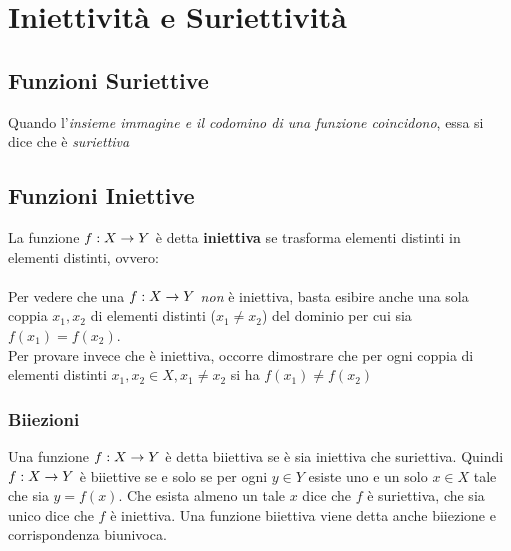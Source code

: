 \documentclass[12pt, a4paper, openany]{book}
\begin{document}
\section{Iniettività e Suriettività}

\subsection*{Funzioni Suriettive}
Quando l'\emph{insieme immagine e il codomino di una funzione coincidono}, essa si dice che è \emph{suriettiva}

\subsection*{Funzioni Iniettive}
La funzione $f: X \rightarrow Y$ è detta \textbf{iniettiva} se trasforma elementi distinti in elementi distinti, ovvero:
\paragraph{}Per vedere che una $f: X \rightarrow Y$ \emph{non} è iniettiva, basta esibire anche una sola coppia $x_1, x_2$ di elementi distinti ($x_1 \neq x_2$) del dominio per cui sia $f(x_1) = f(x_2)$.
\\Per provare invece che è iniettiva, occorre dimostrare che per ogni coppia di elementi distinti $x_1, x_2 \in X, x_1 \neq x_2$ si ha $f(x_1) \neq f(x_2)$

\subsubsection{Biiezioni}
Una funzione $f: X \rightarrow Y$ è detta biiettiva se è sia iniettiva che suriettiva.
Quindi $f: X \rightarrow Y$ è biiettive se e solo se per ogni $y \in Y$ esiste uno e un solo $x \in X$ tale che sia $y = f(x)$.
Che esista almeno un tale $x$ dice che $f$ è suriettiva, che sia unico dice che $f$ è iniettiva.
Una funzione biiettiva viene detta anche biiezione e corrispondenza biunivoca.
\end{document}
